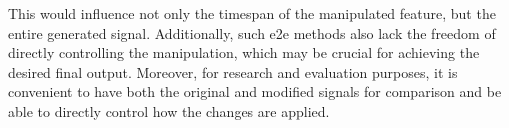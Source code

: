 This would influence not only the timespan of the manipulated feature, but the entire generated signal.
Additionally, such \ac{e2e} methods also lack the freedom of directly controlling the manipulation, which may be crucial for achieving the desired final output.
Moreover, for research and evaluation purposes, it is convenient to have both the original and modified signals for comparison and be able to directly control how the changes are applied.
%
%


